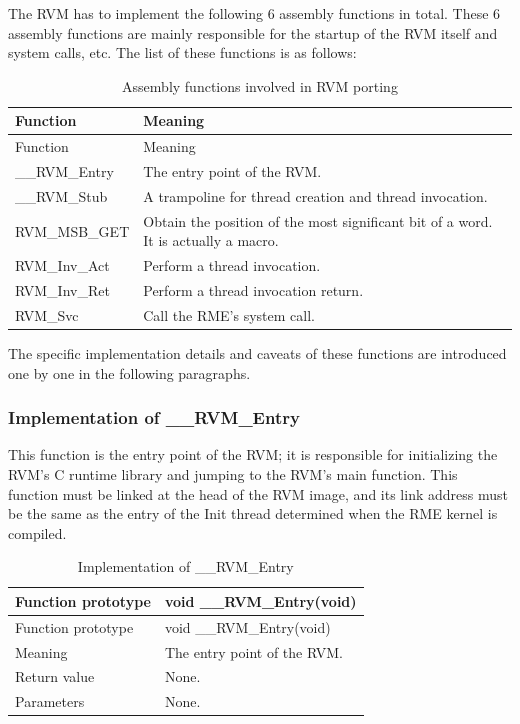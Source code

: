 The RVM has to implement the following 6 assembly functions in total. These 6 assembly functions are mainly responsible for the startup of the RVM itself and system calls, etc. The list of these functions is as follows:

\begin{xltabular}{\textwidth}{@{}>{\hsize\raggedright\arraybackslash}X>{\hsize\raggedright\arraybackslash}X@{}}
\caption{Assembly functions involved in RVM porting}\label{tab:8-6}\\
\toprule
Function & Meaning\tabularnewline
\endfirsthead
\toprule
Function & Meaning\tabularnewline
\midrule
\endhead
\bottomrule
\endlastfoot
\_\allowbreak{}\_\allowbreak{}RVM\_\allowbreak{}Entry & The entry point of the RVM.\tabularnewline
\_\allowbreak{}\_\allowbreak{}RVM\_\allowbreak{}Stub & A trampoline for thread creation and thread invocation.\tabularnewline
RVM\_\allowbreak{}MSB\_\allowbreak{}GET &
Obtain the position of the most significant bit of a word. It is actually a macro.\tabularnewline
RVM\_\allowbreak{}Inv\_\allowbreak{}Act & Perform a thread invocation.\tabularnewline
RVM\_\allowbreak{}Inv\_\allowbreak{}Ret & Perform a thread invocation return.\tabularnewline
RVM\_\allowbreak{}Svc & Call the RME's system call.\tabularnewline
\end{xltabular}

The specific implementation details and caveats of these functions are introduced one by one in the following paragraphs.

\subsubsection{Implementation of \_\_RVM\_Entry}\label{subsubsec:8-2-6-1}

This function is the entry point of the RVM; it is responsible for initializing the RVM's C runtime library and jumping to the RVM's main function. This function must be linked at the head of the RVM image, and its link address must be the same as the entry of the Init thread determined when the RME kernel is compiled.

\begin{xltabular}{\textwidth}{@{}>{\hsize\raggedright\arraybackslash}X>{\hsize\raggedright\arraybackslash}X@{}}
\caption{Implementation of \_\allowbreak{}\_\allowbreak{}RVM\_\allowbreak{}Entry}\label{tab:8-7}\\
\toprule
Function prototype & void \_\allowbreak{}\_\allowbreak{}RVM\_\allowbreak{}Entry(void)\tabularnewline
\endfirsthead
\toprule
Function prototype & void \_\allowbreak{}\_\allowbreak{}RVM\_\allowbreak{}Entry(void)\tabularnewline
\midrule
\endhead
\bottomrule
\endlastfoot
Meaning & The entry point of the RVM.\tabularnewline
Return value & None.\tabularnewline
Parameters & None.\tabularnewline
\end{xltabular}


